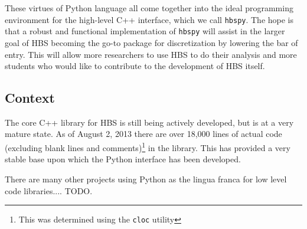     These virtues of Python language all come together into the ideal programming environment for the high-level C++ interface, which we call \texttt{hbspy}. The hope is that a robust and functional implementation of \texttt{hbspy} will assist in the larger goal of HBS becoming the go-to package for discretization by lowering the bar of entry. This will allow more researchers to use HBS to do their analysis and more students who would like to contribute to the development of HBS itself.

  \subsection{Context} \label{ssec:context}


    The core C++ library for HBS is still being actively developed, but is at a very mature state. As of August 2, 2013 there are over 18,000 lines of actual code (excluding blank lines and comments)\footnote{This was determined using the \texttt{cloc} utility} in the library. This has provided a very stable base upon which the Python interface has been developed.


    There are many other projects using Python as the lingua franca for low level code libraries.... TODO.
